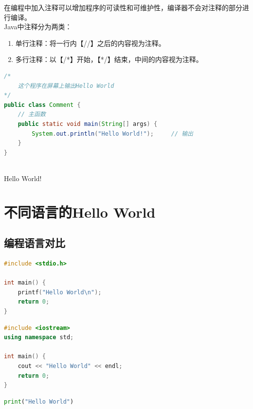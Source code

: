 在编程中加入注释可以增加程序的可读性和可维护性，编译器不会对注释的部分进行编译。 \\

Java中注释分为两类：

\begin{enumerate}
	\item 单行注释：将一行内【//】之后的内容视为注释。
	\item 多行注释：以【/*】开始，【*/】结束，中间的内容视为注释。
\end{enumerate}


\begin{lstlisting}[language=Java]
/*
	这个程序在屏幕上输出Hello World
*/
public class Comment {
	// 主函数
	public static void main(String[] args) {
		System.out.println("Hello World!");		// 输出
	}
}
\end{lstlisting}

\begin{tcolorbox}
	 \\
	Hello World!
\end{tcolorbox}

\newpage

\section{不同语言的Hello World}

\subsection{编程语言对比}


\begin{lstlisting}[language=C]
#include <stdio.h>

int main() {
	printf("Hello World\n");
	return 0;
}
\end{lstlisting}

\vspace{0.5cm}


\begin{lstlisting}[language=C++]
#include <iostream>
using namespace std;

int main() {
	cout << "Hello World" << endl;
	return 0;
}
\end{lstlisting}

\vspace{0.5cm}


\begin{lstlisting}[language=Python]
print("Hello World")
\end{lstlisting}

\newpage